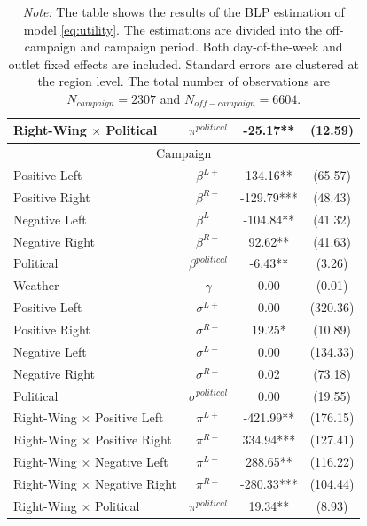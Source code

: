\documentclass[12pt]{article}
\begin{document}
\begin{table}[!htbp]
\begin{threeparttable}
\begin{tabular}{lccc}
			Right-Wing $\times$  Political & $\pi^{political}$ & -25.17** & (12.59) \\
			\hline
			\hline
			\multicolumn{4}{c}{Campaign} \\
			\hline
			\hline
			Positive Left & $\beta^{L+}$ & 134.16** & (65.57) \\
			Positive Right & $\beta^{R+}$ & -129.79*** & (48.43) \\
			Negative Left & $\beta^{L-}$ & -104.84** & (41.32) \\
			Negative Right & $\beta^{R-}$ & 92.62** & (41.63) \\
			Political & $\beta^{political}$ & -6.43** & (3.26) \\
			Weather & $\gamma$ & 0.00 & (0.01) \\
			\hline
			Positive Left & $\sigma^{L+}$ & 0.00 & (320.36) \\
			Positive Right & $\sigma^{R+}$ & 19.25* & (10.89) \\
			Negative Left & $\sigma^{L-}$ & 0.00 & (134.33) \\
			Negative Right & $\sigma^{R-}$ & 0.02 & (73.18) \\
			Political & $\sigma^{political}$ & 0.00 & (19.55) \\
			\hline
			Right-Wing $\times$  Positive Left & $\pi^{L+}$ & -421.99** & (176.15) \\
			Right-Wing $\times$  Positive Right & $\pi^{R+}$ & 334.94*** & (127.41) \\
			Right-Wing $\times$  Negative Left & $\pi^{L-}$ & 288.65** & (116.22) \\
			Right-Wing $\times$  Negative Right & $\pi^{R-}$ & -280.33*** & (104.44) \\
			Right-Wing $\times$  Political & $\pi^{political}$ & 19.34** & (8.93) \\
			\hline
			\hline
		\end{tabular}
		
		
		
		
		\caption*{\small \textit{Note:} The table shows the results of the BLP estimation of model \eqref{eq:utility}. The estimations are divided into the off-campaign and campaign period. Both day-of-the-week and outlet fixed effects are included. Standard errors are clustered at the region level. The total number of observations are $N_{campaign}=2307$ and  $N_{off-campaign}=6604$.}
		
	\end{threeparttable}
\end{table}
\end{document}
